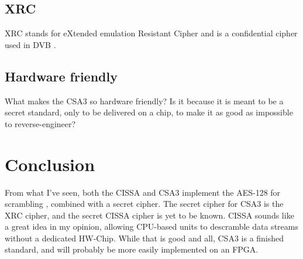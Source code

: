 \subsection{XRC}
XRC stands for eXtended emulation Resistant Cipher and is a confidential cipher 
used in DVB \citep[p. 8]{DVB:2013}.

\subsection{Hardware friendly}
What makes the CSA3 so hardware friendly?
Is it because it is meant to be a secret standard, only to be delivered
on a chip, to make it as good as impossible to reverse-engineer?

\section{Conclusion}
From what I've seen, both the CISSA and CSA3 implement the AES-128 for scrambling
, combined with a secret cipher. The secret cipher for CSA3 is the XRC cipher, 
and the secret CISSA cipher is yet to be known. CISSA sounds like a great idea 
in my opinion, allowing CPU-based units to descramble data streams without a 
dedicated HW-Chip. While that is good and all, CSA3 is a finished standard, and 
will probably be more easily implemented on an FPGA.
